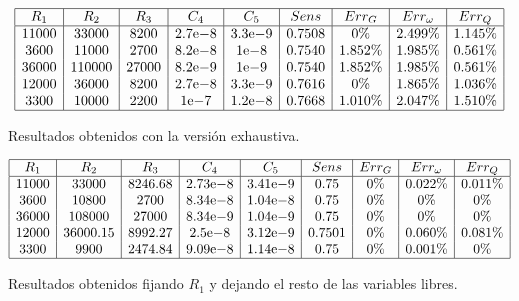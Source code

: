 \documentclass{llncs}
\newcommand{\expnumber}[2]{{#1}\mathrm{e}{#2}}
\begin{document}
	\begin{table}[!h]
		$$
		\begin{array}{|c|c|c|c|c|c|c|c|c|c|}
		\hline
		R_1 & R_2 & R_3 & C_4 & C_5 & Sens & Err_G & Err_\omega & Err_Q \\
		\hline
		11000 & 33000 & 8200 & \expnumber{2.7}{-8} & \expnumber{3.3}{-9} & 0.7508 & 0\% & 2.499\% & 1.145\% \\
		3600 & 11000 & 2700 & \expnumber{8.2}{-8} & \expnumber{1}{-8} & 0.7540 & 1.852\% & 1.985\% & 0.561\% \\
		36000 & 110000 & 27000 & \expnumber{8.2}{-9} & \expnumber{1}{-9} & 0.7540 & 1.852\% & 1.985\% & 0.561\% \\
		12000 & 36000 & 8200 & \expnumber{2.7}{-8} & \expnumber{3.3}{-9} & 0.7616 & 0\% & 1.865\% & 1.036\% \\
		3300 & 10000 & 2200 & \expnumber{1}{-7} & \expnumber{1.2}{-8} & 0.7668 & 1.010\% & 2.047\% & 1.510\% \\
		\hline
		\end{array}
		$$
		\caption{Resultados obtenidos con la versión exhaustiva.}
		\label{cuadroSolsExh}
	\end{table}

	\begin{table}[!h]
		$$
		\begin{array}{|c|c|c|c|c|c|c|c|c|c|}
		\hline
		R_1 & R_2 & R_3 & C_4 & C_5 & Sens & Err_G & Err_\omega & Err_Q \\
		\hline
		11000 & 33000 & 8246.68 & \expnumber{2.73}{-8} & \expnumber{3.41}{-9} & 0.75 & 0\% & 0.022\% & 0.011\% \\
		3600 & 10800 & 2700 & \expnumber{8.34}{-8} & \expnumber{1.04}{-8} & 0.75 & 0\% & 0\% & 0\% \\
		36000 & 108000 & 27000 & \expnumber{8.34}{-9} & \expnumber{1.04}{-9} & 0.75 & 0\% & 0\% & 0\% \\
		12000 & 36000.15 & 8992.27 & \expnumber{2.5}{-8} & \expnumber{3.12}{-9} & 0.7501 & 0\% & 0.060\% & 0.081\% \\
		3300 & 9900 & 2474.84 & \expnumber{9.09}{-8} & \expnumber{1.14}{-8} & 0.75 & 0\% & 0.001\% & 0\% \\
		\hline
		\end{array}
		$$
		\caption{Resultados obtenidos fijando $R_1$ y dejando el resto de las variables libres.}
		\label{cuadroSolsCom}
	\end{table}
\end{document}
